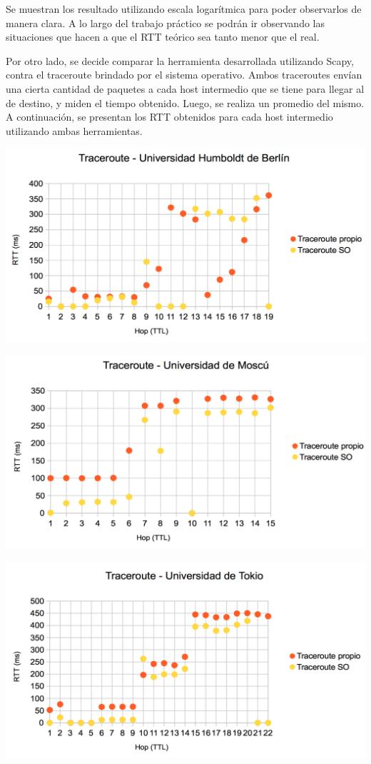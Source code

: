 Se muestran los resultado utilizando escala logarítmica para poder observarlos de manera clara. A lo largo del trabajo práctico se podrán ir observando las situaciones que hacen a que el RTT teórico sea tanto menor que el real.

Por otro lado, se decide comparar la herramienta desarrollada utilizando Scapy, contra el traceroute brindado por el sistema operativo. Ambos traceroutes envían una cierta cantidad de paquetes a cada host intermedio que se tiene para llegar al de destino, y miden el tiempo obtenido. Luego, se realiza un promedio del mismo. A continuación, se presentan los RTT obtenidos para cada host intermedio utilizando ambas herramientas. 

\centerline{\includegraphics[width=1\textwidth]{imagenes/1ra_parte/Alemania_1ergrafico.png}}

\centerline{\includegraphics[width=1\textwidth]{imagenes/1ra_parte/Rusia_1ergrafico.png}}

\centerline{\includegraphics[width=1\textwidth]{imagenes/1ra_parte/Japon_1ergrafico.png}}

